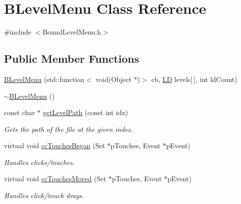 \hypertarget{class_b_level_menu}{\section{\-B\-Level\-Menu \-Class \-Reference}
\label{class_b_level_menu}
}


{\ttfamily \#include $<$\-Bound\-Level\-Menu.\-h$>$}

\subsection*{\-Public \-Member \-Functions}
\begin{DoxyCompactItemize}
\item 
\hyperlink{class_b_level_menu_a0d27ff3c8303ab37a5db7e3afb99847e}{\-B\-Level\-Menu} (std\-::function$<$ void(\-Object $\ast$)$>$ cb, \hyperlink{struct_l_d}{\-L\-D} levels\mbox{[}$\,$\mbox{]}, int ld\-Count)
\item 
\hyperlink{class_b_level_menu_a4646279f37990d842a77eb2e071a3919}{$\sim$\-B\-Level\-Menu} ()
\item 
const char $\ast$ \hyperlink{class_b_level_menu_a38bfb874e8a2d32bb01f4a281032e84c}{get\-Level\-Path} (const int idx)
\begin{DoxyCompactList}\small\item\em \-Gets the path of the file at the given index. \end{DoxyCompactList}\item 
virtual void \hyperlink{class_b_level_menu_a3a7207f8b357ae3e82b26b3507137775}{cc\-Touches\-Began} (\-Set $\ast$p\-Touches, \-Event $\ast$p\-Event)
\begin{DoxyCompactList}\small\item\em \-Handles clicks/touches. \end{DoxyCompactList}\item 
virtual void \hyperlink{class_b_level_menu_a14fc166131531c3c9ef271eb965bfd64}{cc\-Touches\-Moved} (\-Set $\ast$p\-Touches, \-Event $\ast$p\-Event)
\begin{DoxyCompactList}\small\item\em \-Handles click/touch drags. \end{DoxyCompactList}\end{DoxyCompactItemize}


